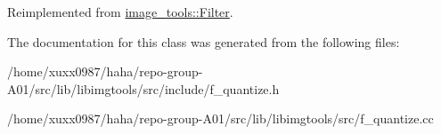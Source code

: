 Reimplemented from \hyperlink{classimage__tools_1_1Filter_afd5d1be5736e343077d331896d4130d9}{image\+\_\+tools\+::\+Filter}.



The documentation for this class was generated from the following files\+:\begin{DoxyCompactItemize}
\item 
/home/xuxx0987/haha/repo-\/group-\/\+A01/src/lib/libimgtools/src/include/f\+\_\+quantize.\+h\item 
/home/xuxx0987/haha/repo-\/group-\/\+A01/src/lib/libimgtools/src/f\+\_\+quantize.\+cc\end{DoxyCompactItemize}
